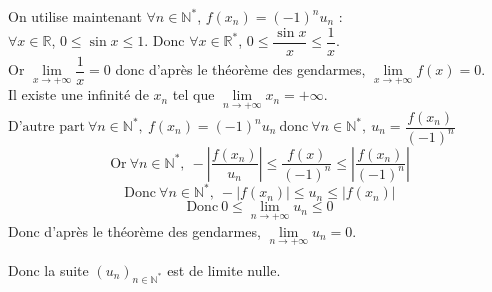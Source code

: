 \documentclass[a4paper,french,bookmarks]{article}
\begin{document}
\begin{enumerate}
\begin{enumerate}
\begin{tcolorbox}[colback=black!3,colframe=black!9,boxrule=.25pt,enhanced,arc is angular,arc=0pt]
        On utilise maintenant $\forall n \in \mathbb{N}^*$, $f(x_n) = (-1)^nu_n$ :\\
        $\forall x \in \mathbb{R}$, $0 \leq \sin x \leq 1$. Donc $\forall x \in \mathbb{R}^*$, $0 \leq \dfrac{\sin x}{x} \leq \dfrac{1}{x}$.\\
        
        Or $\lim\limits_{x \to +\infty} \dfrac{1}{x} = 0$ donc d'après le théorème des gendarmes, $\lim\limits_{x \to +\infty} f(x) = 0$.\\
        Il existe une infinité de $x_n$ tel que $\lim\limits_{n \to +\infty} x_n = +\infty$.\\
        \( \text{D'autre part} \ \forall n \in \mathbb{N}^*, \ f(x_n) = (-1)^nu_n \ \text{donc} \ \forall n \in \mathbb{N}^*, \ u_n = \dfrac{f(x_n)}{\left(-1\right)^n} \)
        \[ \text{Or} \ \forall n \in \mathbb{N}^*, \ -\left|\dfrac{f(x_n)}{u_n}\right| \leq \dfrac{f(x)}{\left(-1\right)^n} \leq \left|\dfrac{f(x_n)}{\left(-1\right)^n}\right| \]
        \[ \text{Donc} \ \forall n \in \mathbb{N}^*, \ -\left|f(x_n)\right| \leq u_n \leq \left|f(x_n)\right| \]
        \[ \text{Donc} \ 0 \leq \lim\limits_{n \to +\infty} u_n \leq 0 \]
        Donc d'après le théorème des gendarmes, $\lim\limits_{n \to +\infty} u_n = 0$.
        
        Donc la suite $\left(u_n\right)_{n\in\mathbb{N}^*}$ est de limite nulle.
    \end{tcolorbox}
\end{enumerate}
\end{enumerate}


\newpage
\end{document}
